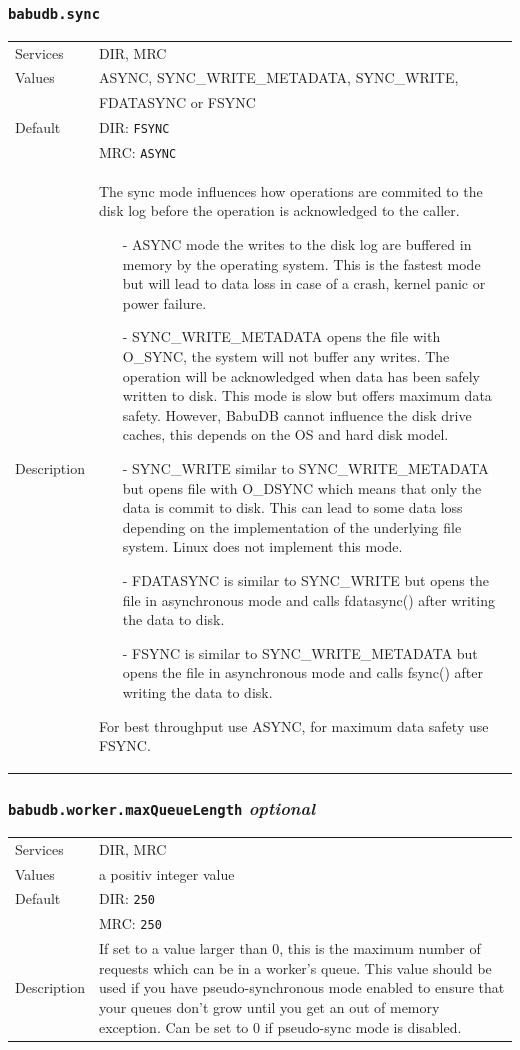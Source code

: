 \documentclass[a4paper,10pt]{book}
\begin{document}
\subsubsection{\texttt{babudb.sync}}
\begin{tabular}{lp{10cm}}
 Services & DIR, MRC\\
 Values   & ASYNC, SYNC\_WRITE\_METADATA, SYNC\_WRITE,\\ 
	      & FDATASYNC or FSYNC\\
 Default  & DIR: \texttt{FSYNC}\\
          & MRC: \texttt{ASYNC}\\
 Description & The sync mode influences how operations are commited to the disk log before the operation is acknowledged to the caller.
\begin{itemize}
 \item[-]ASYNC mode the writes to the disk log are buffered in memory by the operating system. This is the fastest mode but will lead to data loss in case of a crash, kernel panic or power failure.
 \item[-]SYNC\_WRITE\_METADATA opens the file with O\_SYNC, the system will not buffer any writes. The operation will be acknowledged when data has been safely written to disk. This mode is slow but offers maximum data safety. However, BabuDB cannot influence the disk drive caches, this depends on the OS and hard disk model.
 \item[-]SYNC\_WRITE similar to SYNC\_WRITE\_METADATA but opens file with O\_DSYNC which means that only the data is commit to disk. This can lead to some data loss depending on the implementation of the underlying file system. Linux does not implement this mode.
 \item[-]FDATASYNC is similar to SYNC\_WRITE but opens the file in asynchronous mode and calls fdatasync() after writing the data to disk.
 \item[-]FSYNC is similar to SYNC\_WRITE\_METADATA but opens the file in asynchronous mode and calls fsync() after writing the data to disk.
\end{itemize}
For best throughput use ASYNC, for maximum data safety use FSYNC. 
\end{tabular} 

\subsubsection{\texttt{babudb.worker.maxQueueLength} \textit{optional}}
\begin{tabular}{lp{10cm}}
 Services & DIR, MRC\\
 Values   & a positiv integer value\\
 Default  & DIR: \texttt{250}\\
          & MRC: \texttt{250}\\
 Description & If set to a value larger than 0, this is the maximum number of requests which can be in a worker's queue. This value should be used if you have pseudo-synchronous mode enabled to ensure that your queues don't grow until you get an out of memory exception. Can be set to 0 if pseudo-sync mode is disabled. 
\end{tabular}
\end{document}
